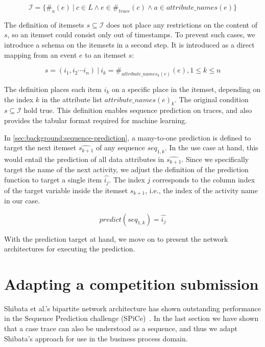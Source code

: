$$\mathscr{I} = \{\#_{a}(e)\ |\ c \in L\wedge e \in \#_{trace}(c) \wedge a \in attribute\_names(e)\}$$

The definition of itemsets $s \subseteq \mathscr{I}$ does not place any restrictions on the content of $s$,
so an itemset could consist only out of timestamps.
To prevent such cases, we introduce a schema on the itemsets in a second step.
It is introduced as a direct mapping from an event $e$ to an itemset $s$:

$$ s = (i_1, i_2 \cdots i_n)\ |\ i_k = \#_{attribute\_names_k(e)}(e), 1 \leq k \leq n $$

The definition places each item $i_k$ on a specific place in the itemset, depending on the index $k$ in the attribute list $attribute\_names(e)_k$.
The original condition $s \subseteq \mathscr{I}$ hold true.
This definition enables sequence prediction on traces, and also provides the tabular format required for machine learning.

In \autoref{sec:background:sequence-prediction}, a many-to-one prediction is defined to target the next itemset $\widehat{s_{k+1}}$ of any sequence $seq_{1,k}$.
In the use case at hand, this would entail the prediction of all data attributes in $\widehat{s_{k+1}}$.
Since we specifically target the name of the next activity, we adjust the definition of the prediction function to target a single item $\hat{i_j}$.
The index $j$ corresponds to the column index of the target variable inside the itemset $s_{k+1}$, i.e., the index of the activity name in our case.

$$ predict(seq_{1,k}) = \hat{i_j} $$

With the prediction target at hand, we move on to present the network architectures for executing the prediction.

\section{Adapting a competition submission}\label{sec:contrib:sp2-inspiration}
Shibata et al.'s bipartite network architecture has shown outstanding performance in the Sequence Prediction challenge (SPiCe)~\cite{web:spice}.
In the last section we have shown that a case trace can also be understood as a sequence, and thus we adapt Shibata's approach for use in the business process domain.

